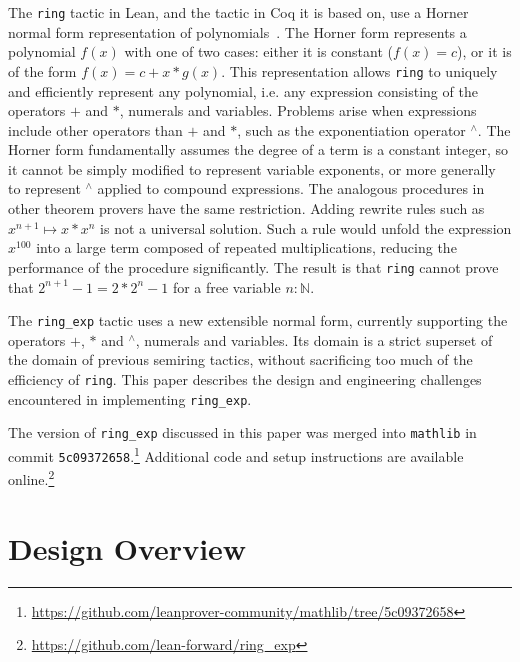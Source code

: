 \documentclass{llncs}
\newcommand{\Q}{\mathbb{Q}}
\newcommand{\lean}[1]{\texttt{#1}\xspace} %
\newcommand{\mathlib}{\texttt{mathlib}\xspace}
\newcommand{\pow}{{${}^\wedge$}\xspace}
\newcommand{\ring}{\lean{ring}}
\newcommand{\ringexp}{\lean{ring\_exp}}
\begin{document}
The \ring tactic in Lean, and the tactic in Coq it is based on,
use a Horner normal form representation of polynomials~\cite{ring-tactic}.
The Horner form represents a polynomial $f(x)$ with one of two cases:
either it is constant ($f(x) = c$), or it is of the form $f(x) = c + x * g(x)$.
This representation
allows \ring to uniquely and efficiently represent any polynomial,
i.e. any expression consisting of the operators $+$ and $*$, numerals and variables.
Problems arise when expressions include other operators than $+$ and $*$, such as the exponentiation operator \pow.
The Horner form fundamentally assumes the degree of a term is a constant integer,
so it cannot be simply modified to represent variable exponents,
or more generally to represent \pow applied to compound expressions.
The analogous procedures in other theorem provers have the same restriction.
Adding rewrite rules such as $x^{n+1} \mapsto x * x^n$ is not a universal solution.
Such a rule would unfold the expression $x^{100}$ into a large term composed of repeated multiplications,
reducing the performance of the procedure significantly.
The result is that \ring cannot prove that $2^{n+1} - 1 = 2 * 2^n - 1$ for a free variable $n : \mathbb{N}$.

The \ringexp tactic uses a new extensible normal form, currently supporting the operators $+$, $*$ and \pow, numerals and variables.
Its domain is a strict superset of the domain of previous semiring tactics,
without sacrificing too much of the efficiency of \ring.
This paper describes the design and engineering challenges encountered in implementing \ringexp.

The version of \ringexp discussed in this paper was merged into \mathlib in commit \texttt{5c09372658}.\footnote{\url{https://github.com/leanprover-community/mathlib/tree/5c09372658}}
Additional code and setup instructions are available online.\footnote{\url{https://github.com/lean-forward/ring_exp}}

\section{Design Overview}
\end{document}
